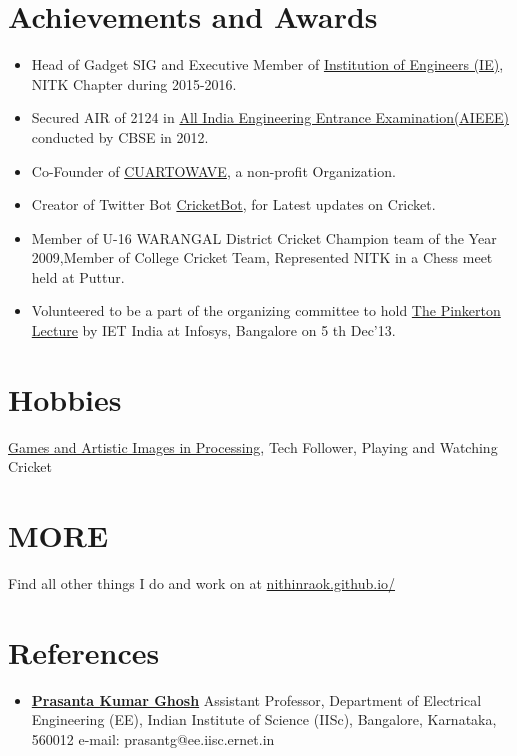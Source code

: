 \documentclass[margin, centered]{res}
\begin{document}
\begin{resume}
\section{Achievements and Awards}
\begin{itemize}[leftmargin=*]
 \item Head of Gadget SIG and Executive Member of \href{www.ienitk.in}{Institution of Engineers (IE)}, NITK Chapter during 2015-2016.
 \item Secured AIR of 2124 in \href{www.jeemain.nic.in}{All India Engineering Entrance Examination(AIEEE)} conducted by CBSE in 2012.
 \item Co-Founder of \href{https://www.facebook.com/CuartoWave/}{CUARTOWAVE}, a non-profit Organization.
 \item Creator of Twitter Bot \href{https://twitter.com/bot_cricket/}{CricketBot}, for Latest updates on Cricket.
 \item Member of U-16 WARANGAL District Cricket Champion team of the Year 2009,Member of College Cricket Team, Represented NITK in a Chess meet held at Puttur.
 \item Volunteered to be a part of the organizing committee to hold \href{http://conferences.theiet.org/pinkerton/}{The Pinkerton Lecture}  by IET India at Infosys, Bangalore on 5 th Dec'13.
\end{itemize}


\section{Hobbies}
\href{https://www.openprocessing.org/user/71442/#Sketches}{Games and Artistic Images in Processing}, Tech Follower, Playing and Watching Cricket

\section{MORE}
Find all other things I do and work on at \href{https://nithinraok.github.io}{nithinraok.github.io/}

\section{References}
\begin{itemize}[leftmargin=*]
 \item \textbf{\href{http://www.ee.iisc.ac.in/people/faculty/prasantg/}{Prasanta Kumar Ghosh}}\newline
Assistant Professor, \newline
Department of Electrical Engineering (EE),\newline
Indian Institute of Science (IISc),\newline
Bangalore, Karnataka, 560012\newline
e-mail: prasantg@ee.iisc.ernet.in


\end{itemize}
\end{resume}
\end{document}
